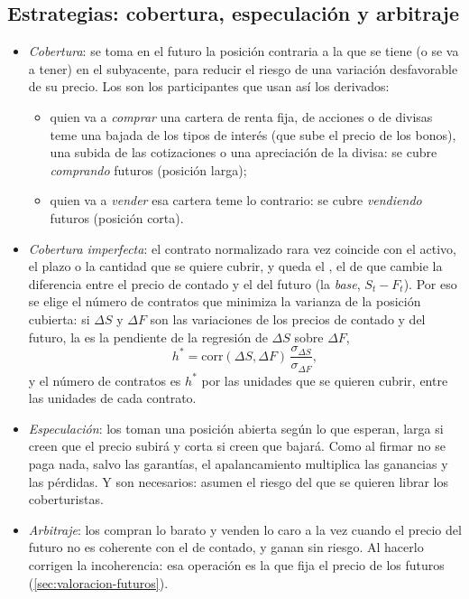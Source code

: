\documentclass[11pt]{article}
\begin{document}
\subsection{Estrategias: cobertura, especulación y arbitraje}\label{sec:estrategias-futuros}

\begin{itemize}
\item \emph{Cobertura}: se toma en el futuro la posición contraria a la que se tiene (o se va a tener) en el subyacente, para reducir el riesgo de una variación desfavorable de su precio. Los  son los participantes que usan así los derivados:
  \begin{itemize}
  \item quien va a \emph{comprar} una cartera de renta fija, de acciones o de divisas teme una bajada de los tipos de interés (que sube el precio de los bonos), una subida de las cotizaciones o una apreciación de la divisa: se cubre \emph{comprando} futuros (posición larga);
  \item quien va a \emph{vender} esa cartera teme lo contrario: se cubre \emph{vendiendo} futuros (posición corta).
  \end{itemize}
\item \emph{Cobertura imperfecta}: el contrato normalizado rara vez coincide con el activo, el plazo o la cantidad que se quiere cubrir, y queda el , el de que cambie la diferencia entre el precio de contado y el del futuro (la \emph{base}, $S_t-F_t$). Por eso se elige el número de contratos que minimiza la varianza de la posición cubierta: si $\Delta S$ y $\Delta F$ son las variaciones de los precios de contado y del futuro, la  es la pendiente de la regresión de $\Delta S$ sobre $\Delta F$,
  \begin{equation}\label{eq:ratio-cobertura}
  h^{*}=\mathrm{corr}(\Delta S,\Delta F)\,\frac{\sigma_{\Delta S}}{\sigma_{\Delta F}},
  \end{equation}
  y el número de contratos es $h^{*}$ por las unidades que se quieren cubrir, entre las unidades de cada contrato\nocite{Hull2022Options}.
\item \emph{Especulación}: los  toman una posición abierta según lo que esperan, larga si creen que el precio subirá y corta si creen que bajará. Como al firmar no se paga nada, salvo las garantías, el apalancamiento multiplica las ganancias y las pérdidas. Y son necesarios: asumen el riesgo del que se quieren librar los coberturistas.
\item \emph{Arbitraje}: los  compran lo barato y venden lo caro a la vez cuando el precio del futuro no es coherente con el de contado, y ganan sin riesgo. Al hacerlo corrigen la incoherencia: esa operación es la que fija el precio de los futuros (\ref{sec:valoracion-futuros}).
\end{itemize}
\end{document}
